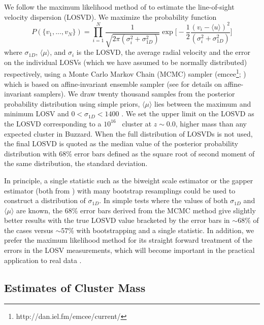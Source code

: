 We follow the maximum likelihood method of \cite{Walker2006} to estimate the line-of-sight velocity dispersion (LOSVD). We maximize the probability function 
\begin{equation}\label{eq: jointGaussian}
P(\{v_1, ..., v_N\})=\displaystyle\prod_{i=1}^{N}\frac{1}{\sqrt{2\pi(\sigma_i^2+\sigma_{1D}^2)}}\exp\biggl[-\frac{1}{2}\frac{(v_i-\langle u \rangle)^2}{(\sigma_i^2+\sigma_{1D}^2)}\biggr]
\end{equation}
where $\sigma_{1D}$, $\langle\mu\rangle$, and $\sigma_i$ is the LOSVD, the average radial velocity and the error on the individual LOSVs (which we have assumed to be normally distributed) respectively, using a Monte Carlo Markov Chain (MCMC) sampler ({\sc emcee}\footnote{http://dan.iel.fm/emcee/current/}; \citealt{Foreman-Mackey2013}) which is based on affine-invariant ensemble sampler (see \citealt{Goodman2010} for details on affine-invariant samplers). We draw twenty thousand samples from the posterior probability distribution using simple priors, $\langle\mu\rangle$ lies between the maximum and minimum LOSV and $0< \sigma_{1D} < 1400$ \kms. We set the upper limit on the LOSVD as the LOSVD corresponding to a $10^{16}$ \Msol\ cluster at $z\sim0.0$, higher mass than any expected cluster in Buzzard. When the full distribution of LOSVDs is not used, the final LOSVD is quoted as the median value of the posterior probability distribution with 68\% error bars defined as the square root of second moment of the same distribution, the standard deviation.

In principle, a single statistic such as the biweight scale estimator or the gapper estimator (both from \citealt{Beers1990}) with many bootstrap resamplings could be used to construct a distribution of $\sigma_{1D}$. In simple tests where the values of both $\sigma_{1D}$ and $\langle\mu\rangle$ are known, the 68\% error bars derived from the MCMC method give slightly better results with the true LOSVD value bracketed by the error bars in $\sim68\%$ of the cases versus $\sim57\%$ with bootstrapping and a single statistic. In addition, we prefer the maximum likelihood method for its straight forward treatment of the errors in the LOSV measurements, which will become important in the practical application to real data .

\subsection{Estimates of Cluster Mass}\label{sec: mass}
